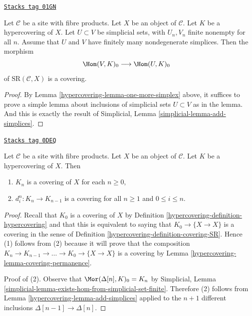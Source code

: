\begin{lemma}
\label{hypercovering-lemma-add-simplices}
\href{https://stacks.math.columbia.edu/tag/01GN}{\texttt{Stacks tag 01GN}}

Let $\mathcal{C}$ be a site with fibre products.
Let $X$ be an object of $\mathcal{C}$.
Let $K$ be a hypercovering of $X$.
Let $U \subset V$ be simplicial sets, with $U_n, V_n$
finite nonempty for all $n$.
Assume that $U$ and $V$ have finitely many nondegenerate simplices.
Then the morphism
$$
\Hom(V, K)_0
\longrightarrow
\Hom(U, K)_0
$$
of $\text{SR}(\mathcal{C}, X)$ is a covering.
\end{lemma}

\begin{proof}

By Lemma \ref{hypercovering-lemma-one-more-simplex}
above, it suffices to prove a simple lemma
about inclusions of simplicial sets $U \subset V$ as in the
lemma. And this is exactly the result of
Simplicial, Lemma \ref{simplicial-lemma-add-simplices}.
\end{proof}

\begin{lemma}
\label{hypercovering-lemma-degeneracy-maps-coverings}
\href{https://stacks.math.columbia.edu/tag/0DEQ}{\texttt{Stacks tag 0DEQ}}

Let $\mathcal{C}$ be a site with fibre products. Let $X$ be an object of
$\mathcal{C}$. Let $K$ be a hypercovering of $X$. Then
\begin{enumerate}
\item $K_n$ is a covering of $X$ for each $n \geq 0$,
\item $d^n_i : K_n \to K_{n - 1}$ is a covering for all $n \geq 1$
and $0 \leq i \leq n$.
\end{enumerate}
\end{lemma}

\begin{proof}

Recall that $K_0$ is a covering of $X$ by
Definition \ref{hypercovering-definition-hypercovering}
and that this is equivalent to saying that
$K_0 \to \{X \to X\}$ is a covering in the sense
of Definition \ref{hypercovering-definition-covering-SR}.
Hence (1) follows from (2) because it will prove that
the composition
$K_n \to K_{n - 1} \to \ldots \to K_0 \to \{X \to X\}$
is a covering by Lemma \ref{hypercovering-lemma-covering-permanence}.

\medskip\noindent
Proof of (2). Observe that
$\Mor(\Delta[n], K)_0 = K_n$ by
Simplicial, Lemma \ref{simplicial-lemma-exists-hom-from-simplicial-set-finite}.
Therefore (2) follows from Lemma \ref{hypercovering-lemma-add-simplices}
applied to the $n + 1$ different inclusions $\Delta[n - 1] \to \Delta[n]$.
\end{proof}

